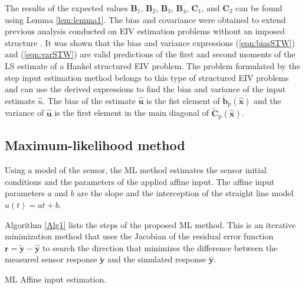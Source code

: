 The results of the expected values $\mathbf{B}_1$, $\mathbf{B}_2$, $\mathbf{B}_3$, $\mathbf{B}_4$, $\mathbf{C}_1$, and $\mathbf{C}_2$ can be found using Lemma \ref{lem:lemma1}.
The bias and covariance were obtained to extend previous analysis conducted on EIV estimation problems without an imposed structure \citep{Vaccaro94, Stewart90SPT}.
It was shown that the bias and variance expressions (\ref{eqn:biasSTW}) and (\ref{eqn:varSTW}) are valid predictions of the first and second moments of the LS estimate of a Hankel structured EIV problem.
The problem formulated by the step input estimation method belongs to this type of structured EIV problems and can use the derived expressions to find the bias and variance of the input estimate $\widehat{u}$.
The bias of the estimate $\widehat{\mathbf{u}}$ is the fist element of $\widetilde{\mathbf{b}}_{\mathrm{p}} \left( \widehat{\mathbf{x}} \right)$ and the variance of $\widehat{\mathbf{u}}$ is the first element in the main diagonal of $\widetilde{\mathbf{C}}_{\mathrm{p}} \left( \widehat{\mathbf{x}} \right)$.




\subsection{Maximum-likelihood method}
Using a model of the sensor, the ML method estimates the sensor initial conditions and the parameters of the applied affine input.
The affine input parameters $a$ and $b$ are the slope and the interception of the straight line model $u(t) = at + b$.

Algorithm \ref{Alg1} lists the steps of the proposed ML method.
This is an iterative minimization method that uses the Jacobian of the residual error function $\mathbf{r} = \widetilde{\mathbf{y}} - \widehat{\mathbf{y}}$ to search the direction that minimizes the difference between the measured sensor response $\widetilde{\mathbf{y}}$ and the simulated response $\widehat{\mathbf{y}}$.

\begin{algorithm}
\caption{ML Affine input estimation.}\label{Alg1}
\begin{algorithmic}
\ENDFOR
{}

\end{algorithmic}
\end{algorithm}

